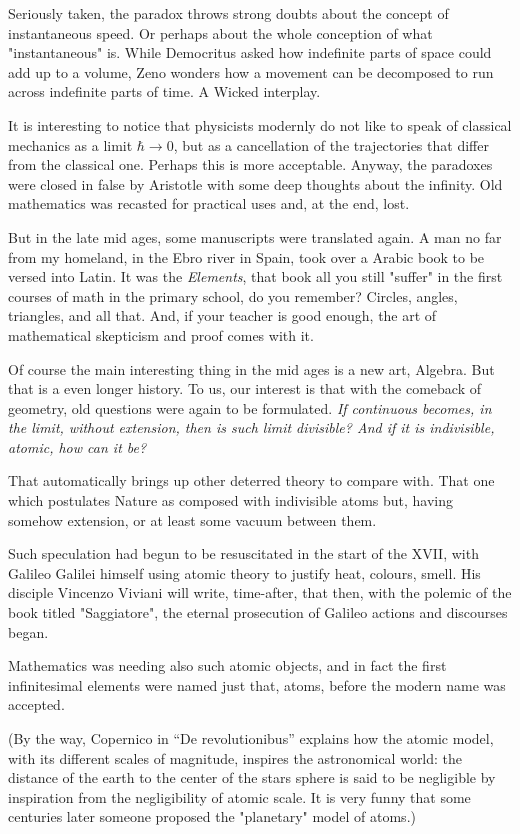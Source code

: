 \documentclass[a4paper,10pt]{article}
\begin{document}
Seriously taken, the paradox throws strong doubts about the concept of
instantaneous speed. Or perhaps about the 
whole conception of what "instantaneous" is. While Democritus asked how
indefinite parts of space could add up to a volume, Zeno wonders how a
movement can be decomposed to run across indefinite parts of time. A Wicked
interplay.  

It is interesting to notice that physicists modernly do not like to
speak of classical mechanics as a limit $\hbar \to 0$, but as a cancellation
of the trajectories that differ from the classical one. Perhaps this
is more acceptable. Anyway, 
the paradoxes were closed in false by Aristotle with some deep thoughts 
about the infinity.  Old mathematics was recasted for practical
uses and, at the end, lost. 

But in the late mid ages, some manuscripts were translated again. A man
no far from my homeland, in the Ebro river in Spain, took
over a Arabic book to be versed into Latin. It was the {\it Elements}, that 
book all you still "suffer" in the first courses of math in the primary school,
do you remember? Circles, angles, triangles, and all that. And, if your teacher
is good enough, the art of mathematical skepticism and proof comes
with it. 

Of course the main interesting thing in the mid ages is a new art, Algebra. 
But that is a even longer history. To us, our interest is that with
the comeback of geometry, old questions were again to be formulated. 
{\it If continuous becomes, in the limit, without extension, then is such
limit divisible? And if it is indivisible, atomic, how can it be?} 

That automatically brings up other deterred theory to compare with. That
one which postulates Nature as composed with indivisible atoms but, 
having somehow extension, or at least some vacuum between them.

Such speculation had begun to be resuscitated in the start of the XVII,
with Galileo Galilei himself using atomic theory to justify heat, colours,
smell. His disciple Vincenzo Viviani will write, time-after, that then, with
the polemic of the book titled "Saggiatore", the eternal prosecution 
of Galileo actions and discourses began.

Mathematics was needing also such atomic objects, and in fact the first
infinitesimal elements were named just that, atoms, before the modern
name was accepted. 

(By the way, Copernico in ``De revolutionibus'' explains how the atomic
model, with its different scales of magnitude, inspires the
astronomical world: the distance of the earth to the center
of the stars sphere is said to be negligible by inspiration
from the negligibility of atomic scale. It is very funny that some centuries 
later someone proposed the "planetary" model of atoms.)
\end{document}
